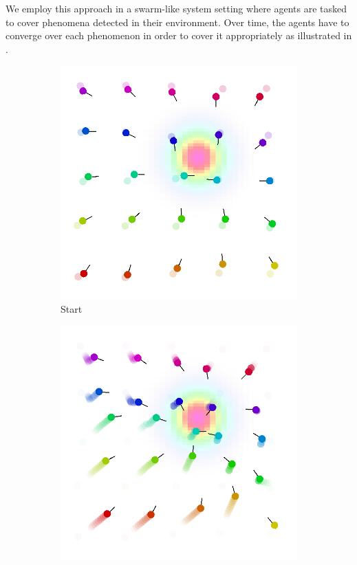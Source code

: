 We employ this approach in a swarm-like system setting where agents are tasked to cover phenomena detected in their environment. Over time, the agents have to converge over each phenomenon in order to cover it appropriately as illustrated in .
\begin{figure}[t]
	\centering
	\begin{subfigure}[b]{0.32\linewidth}
		\includegraphics[width=\textwidth]{papers/acsos2023/imgs/start.png}
		\caption{Start}
		\label{fig:initial}
	\end{subfigure}
	\begin{subfigure}[b]{0.32\linewidth}
		\includegraphics[width=\textwidth]{papers/acsos2023/imgs/after.png}

\end{subfigure}
\end{figure}
